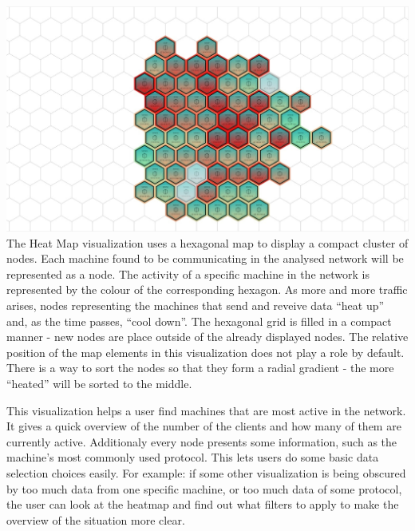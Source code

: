 \includegraphics[width=\linewidth]{materials/heat-map.jpg}
The Heat Map visualization uses a hexagonal map to display a compact cluster of nodes.
Each machine found to be communicating in the analysed network will be represented as a node.
The activity of a specific machine in the network is represented by the colour of the 
corresponding hexagon. As more and more traffic arises, nodes representing the machines that
send and reveive data ``heat up'' and, as the time passes, ``cool down''.
The hexagonal grid is filled in a compact manner - new nodes are place outside of 
the already displayed nodes. The relative position of the map elements in this visualization
does not play a role by default. There is a way to sort the nodes so that they form a radial 
gradient - the more ``heated'' will be sorted to the middle.

This visualization helps a user find machines that are most active in the network.
It gives a quick overview of the number of the clients and how many of them are currently active.
Additionaly every node presents some information, such as the machine's most commonly used protocol.
This lets users do some basic data selection choices easily. For example: if some other visualization
is being obscured by too much data from one specific machine, or too much data of some protocol,
the user can look at the heatmap and find out what filters to apply to make the overview of the situation
more clear.
